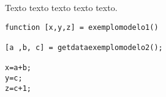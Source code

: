 \appendix 
\newappendix\label{apendiceA} %
Texto texto texto texto texto.

\begin{lstlisting}[caption= Exemplo de ambiente código, label = {cod:ambcod}]
function [x,y,z] = exemplomodelo1()

[a ,b, c] = getdataexemplomodelo2();

x=a+b;
y=c;
z=c+1;
\end{lstlisting}


